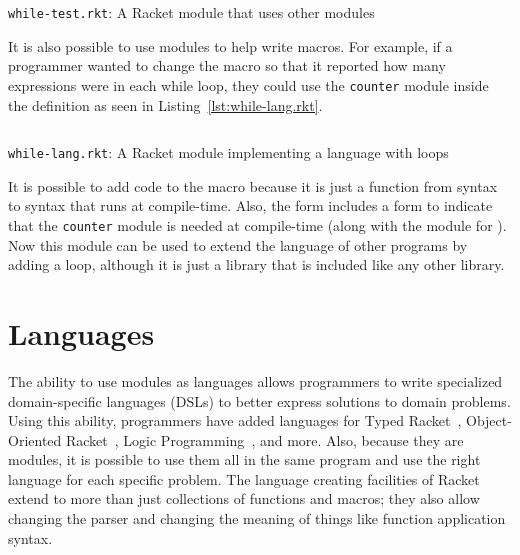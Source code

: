 \begin{listing}
  \inputminted{racket}{listings/while-test.rkt}
  \caption{\texttt{while-test.rkt}: A Racket module that uses other modules}
  \label{lst:while-test.rkt}
\end{listing}

It is also possible to use modules to help write macros.
For example, if a programmer wanted to change the  macro so that it reported how many expressions were in each while loop, they could use the \texttt{counter} module inside the  definition as seen in Listing~\ref{lst:while-lang.rkt}.
\begin{listing}
  \inputminted{racket}{listings/while-lang.rkt}
  \caption{\texttt{while-lang.rkt}: A Racket module implementing a language with  loops}
  \label{lst:while-lang.rkt}
\end{listing}
It is possible to add code to the  macro because it is just a function from syntax to syntax that runs at compile-time. 
Also, the  form includes a  form to indicate that the \texttt{counter} module is needed at compile-time (along with the  module for ).
Now this module can be used to extend the language of other programs by adding a  loop, although it is just a library that is included like any other library.

\section{Languages}
The ability to use modules as languages allows programmers to write specialized domain-specific languages (DSLs) to better express solutions to domain problems. 
Using this ability, programmers have added languages for Typed Racket~\cite{typed}, Object-Oriented Racket~\cite{oo}, Logic Programming~\cite{logic}, and more.
Also, because they are modules, it is possible to use them all in the same program and use the right language for each specific problem.
The language creating facilities of Racket extend to more than just collections of functions and macros; they also allow changing the parser and changing the meaning of things like function application syntax. 

